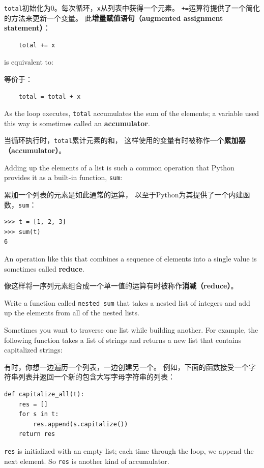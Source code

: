 \documentclass[10pt]{book}
\begin{document}
\begin{CJK}{UTF8}{gbsn}
{\tt total}初始化为0。每次循环，{\tt x}从列表中获得一个元素。
{\tt +=}运算符提供了一个简化的方法来更新一个变量。
此{\bf 增量赋值语句（augmented assignment statement）}：

\begin{verbatim}
    total += x
\end{verbatim}
%
is equivalent to:

等价于：

\begin{verbatim}
    total = total + x
\end{verbatim}
%
As the loop executes, {\tt total} accumulates the sum of the
elements; a variable used this way is sometimes called an
{\bf accumulator}.

当循环执行时，{\tt total}累计元素的和，
这样使用的变量有时被称作一个{\bf 累加器（accumulator）}。

Adding up the elements of a list is such a common operation
that Python provides it as a built-in function, {\tt sum}:

累加一个列表的元素是如此通常的运算，
以至于Python为其提供了一个内建函数，{\tt sum}：

\begin{verbatim}
>>> t = [1, 2, 3]
>>> sum(t)
6
\end{verbatim}
%
An operation like this that combines a sequence of elements into
a single value is sometimes called {\bf reduce}.

像这样将一序列元素组合成一个单一值的运算有时被称作{\bf 消减（reduce）}。

\begin{exercise}

Write a function called \verb"nested_sum" that takes a nested list
of integers and add up the elements from all of the nested lists.

\end{exercise}

Sometimes you want to traverse one list while building
another.  For example, the following function takes a list of strings
and returns a new list that contains capitalized strings:

有时，你想一边遍历一个列表，一边创建另一个。
例如，下面的函数接受一个字符串列表并返回一个新的包含大写字母字符串的列表：

\begin{verbatim}
def capitalize_all(t):
    res = []
    for s in t:
        res.append(s.capitalize())
    return res
\end{verbatim}
%
{\tt res} is initialized with an empty list; each time through
the loop, we append the next element.  So {\tt res} is another
kind of accumulator.


\end{CJK}
\end{document}
